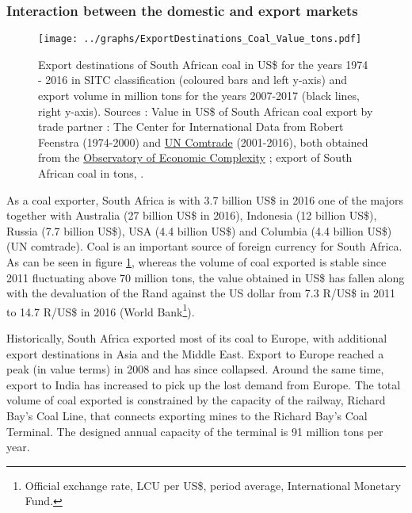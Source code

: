 \documentclass[12pt,english]{article}
\begin{document}
\subsubsection{Interaction between the domestic and export markets}\label{DomesticExport}

\begin{figure}[!t]
	\hspace{-20pt}\texttt{[image: ../graphs/ExportDestinations\_Coal\_Value\_tons.pdf]}
	\caption{\label{ExportDestinations_Coal}\small Export destinations of South African coal in US\$ for the years 1974 - 2016 in SITC classification (coloured bars and left y-axis) and export volume in million tons for the years 2007-2017 (black lines, right y-axis). Sources : Value in US\$ of South African coal export by trade partner : The Center for International Data from Robert Feenstra \citep{feenstra2005world} (1974-2000) and \href{https://comtrade.un.org/}{UN Comtrade} (2001-2016), both obtained from the \href{https://atlas.media.mit.edu/en/visualize/line/sitc/export/zaf/show/3222/1962.2016/}{Observatory of Economic Complexity} ; export of South African coal in tons, .}
\end{figure}

As a coal exporter, South Africa is with 3.7 billion US\$ in 2016 one of the majors together with Australia (27 billion US\$ in 2016), Indonesia (12 billion US\$), Russia (7.7 billion US\$), USA (4.4 billion US\$) and Columbia (4.4 billion US\$) (UN comtrade). Coal is an important source of foreign currency for South Africa. %
As can be seen in figure \ref{ExportDestinations_Coal}, whereas the volume of coal exported is stable since 2011 fluctuating above 70 million tons, the value obtained in US\$ has fallen along with the devaluation of the Rand against the US dollar from 7.3 R/US\$ in 2011 to 14.7 R/US\$ in 2016 (World Bank\footnote{Official exchange rate, LCU per US\$, period average, International Monetary Fund.}). 

Historically, South Africa exported most of its coal to Europe, with additional export destinations in Asia and the Middle East. Export to Europe reached a peak (in value terms) in 2008 and has since collapsed. Around the same time, export to India has increased to pick up the lost demand from Europe. The total volume of coal exported is constrained by the capacity of the railway, Richard Bay's Coal Line, that connects exporting mines to the Richard Bay's Coal Terminal. The designed annual capacity of the terminal is 91 million tons per year.
\end{document}

